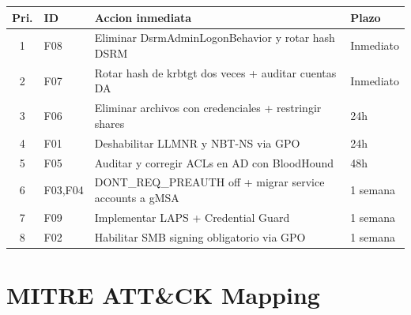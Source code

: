 \documentclass[11pt,a4paper]{article}
\begin{document}
\begin{center}
\begin{tabularx}{\textwidth}{clXl}
\toprule
\textbf{Pri.} & \textbf{ID} & \textbf{Accion inmediata} & \textbf{Plazo} \\
\midrule
1 & F08      & Eliminar DsrmAdminLogonBehavior y rotar hash DSRM      & Inmediato \\
2 & F07      & Rotar hash de krbtgt dos veces + auditar cuentas DA    & Inmediato \\
3 & F06      & Eliminar archivos con credenciales + restringir shares  & 24h \\
4 & F01      & Deshabilitar LLMNR y NBT-NS via GPO                    & 24h \\
5 & F05      & Auditar y corregir ACLs en AD con BloodHound           & 48h \\
6 & F03,F04  & DONT\_REQ\_PREAUTH off + migrar service accounts a gMSA & 1 semana \\
7 & F09      & Implementar LAPS + Credential Guard                    & 1 semana \\
8 & F02      & Habilitar SMB signing obligatorio via GPO              & 1 semana \\
\bottomrule
\end{tabularx}
\end{center}

\newpage

\section{MITRE ATT\&CK Mapping}
\end{document}
